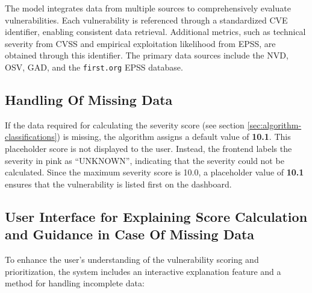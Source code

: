 The model integrates data from multiple sources to comprehensively evaluate vulnerabilities. Each vulnerability is referenced through a standardized \ac{CVE} identifier, enabling consistent data retrieval. Additional metrics, such as technical severity from \ac{CVSS} and empirical exploitation likelihood from \ac{EPSS}, are obtained through this identifier. The primary data sources include the \ac{NVD}, \ac{OSV}, \ac{GAD}, and the \texttt{first.org} \ac{EPSS} database.

\subsection{Handling Of Missing Data}
\label{subsec:handling-missing-data}

If the data required for calculating the severity score (see section \ref{sec:algorithm-classifications}) is missing, the algorithm assigns a default value of \textbf{10.1}. This placeholder score is not displayed to the user. Instead, the frontend labels the severity in pink as “UNKNOWN”, indicating that the severity could not be calculated. Since the maximum severity score is 10.0, a placeholder value of \textbf{10.1} ensures that the vulnerability is listed first on the dashboard.

\subsection{User Interface for Explaining Score Calculation and Guidance in Case Of Missing Data}
\label{subsec:ui-explaining-score}

To enhance the user’s understanding of the vulnerability scoring and prioritization, the system includes an interactive explanation feature and a method for handling incomplete data:

